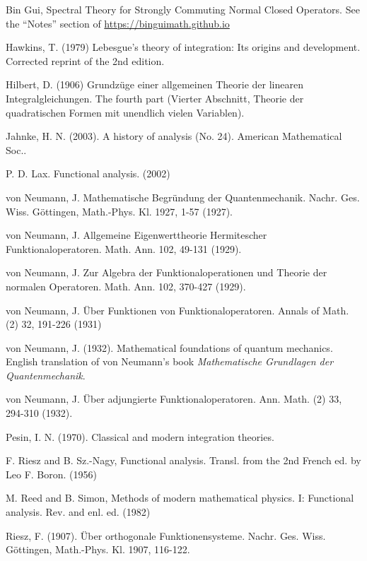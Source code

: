 \documentclass[12pt,b5paper,notitlepage]{article}
\theoremstyle{definition}
\theoremstyle{plain}
\numberwithin{equation}{section}
\begin{document}
\begin{thebibliography}{999999}
Bin Gui, Spectral Theory for Strongly Commuting Normal Closed Operators. See the ``Notes'' section of \url{https://binguimath.github.io}
%

Hawkins, T. (1979) Lebesgue's theory of integration: Its origins and development. Corrected reprint of the 2nd edition. 

Hilbert, D. (1906) Grundz\"uge einer allgemeinen Theorie der linearen Integralgleichungen. The fourth part (Vierter Abschnitt, Theorie der quadratischen Formen mit unendlich vielen Variablen).

Jahnke, H. N. (2003). A history of analysis (No. 24). American Mathematical Soc..

P. D. Lax. Functional analysis. (2002)

von Neumann, J. Mathematische {Begr{\"u}ndung} der {Quantenmechanik}. Nachr. Ges. Wiss. G{\"o}ttingen, Math.-Phys. Kl. 1927, 1-57 (1927).


von Neumann, J. Allgemeine Eigenwerttheorie Hermitescher Funktionaloperatoren. Math. Ann. 102, 49-131 (1929).


von Neumann, J. Zur Algebra der Funktionaloperationen und Theorie der normalen Operatoren. Math. Ann. 102, 370-427 (1929).



von Neumann, J. \"Uber Funktionen von Funktionaloperatoren. Annals of Math. (2) 32, 191-226 (1931)


von Neumann, J. (1932). Mathematical foundations of quantum mechanics. English translation of von Neumann's book \textit{Mathematische Grundlagen der Quantenmechanik}.



von Neumann, J. {\"U}ber adjungierte {Funktionaloperatoren}. Ann. Math. (2) 33, 294-310 (1932).



Pesin, I. N. (1970). Classical and modern integration theories.


F. Riesz and B. Sz.-Nagy, Functional analysis. Transl. from the 2nd French ed. by Leo F.
Boron. (1956)

M. Reed and B. Simon, Methods of modern mathematical physics. {I}: {Functional} analysis. {Rev}. and enl. ed. (1982)

Riesz, F. (1907). \"Uber orthogonale Funktionensysteme. Nachr. Ges. Wiss. G{\"o}ttingen, Math.-Phys. Kl.  1907, 116-122.



\end{thebibliography}
\end{document}
